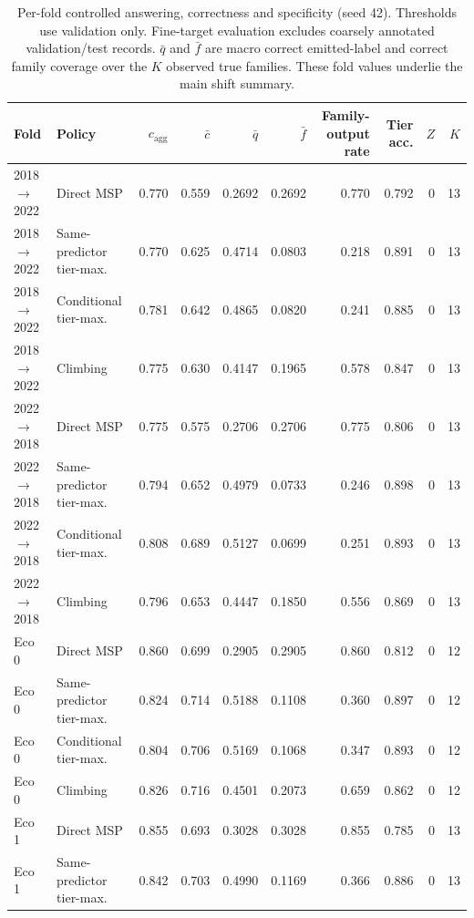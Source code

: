 \begin{table}[htbp]
\centering\footnotesize
\setlength{\tabcolsep}{3pt}
\caption{Per-fold controlled answering, correctness and specificity (seed 42). Thresholds use validation only. Fine-target evaluation excludes coarsely annotated validation/test records. $\bar q$ and $\bar f$ are macro correct emitted-label and correct family coverage over the $K$ observed true families. These fold values underlie the main shift summary.}\label{tab:supp-controls-folds}
\begin{tabular}{llrrrrrrrr}
\toprule
Fold & Policy & $c_{\mathrm{agg}}$ & $\bar c$ & $\bar q$ & $\bar f$ & \shortstack{Family-output\\rate} & Tier acc. & $Z$ & $K$ \\
\midrule
2018$\to$2022 & Direct MSP & 0.770 & 0.559 & 0.2692 & 0.2692 & 0.770 & 0.792 & 0 & 13 \\
2018$\to$2022 & Same-predictor tier-max. & 0.770 & 0.625 & 0.4714 & 0.0803 & 0.218 & 0.891 & 0 & 13 \\
2018$\to$2022 & Conditional tier-max. & 0.781 & 0.642 & 0.4865 & 0.0820 & 0.241 & 0.885 & 0 & 13 \\
2018$\to$2022 & Climbing & 0.775 & 0.630 & 0.4147 & 0.1965 & 0.578 & 0.847 & 0 & 13 \\
2022$\to$2018 & Direct MSP & 0.775 & 0.575 & 0.2706 & 0.2706 & 0.775 & 0.806 & 0 & 13 \\
2022$\to$2018 & Same-predictor tier-max. & 0.794 & 0.652 & 0.4979 & 0.0733 & 0.246 & 0.898 & 0 & 13 \\
2022$\to$2018 & Conditional tier-max. & 0.808 & 0.689 & 0.5127 & 0.0699 & 0.251 & 0.893 & 0 & 13 \\
2022$\to$2018 & Climbing & 0.796 & 0.653 & 0.4447 & 0.1850 & 0.556 & 0.869 & 0 & 13 \\
Eco 0 & Direct MSP & 0.860 & 0.699 & 0.2905 & 0.2905 & 0.860 & 0.812 & 0 & 12 \\
Eco 0 & Same-predictor tier-max. & 0.824 & 0.714 & 0.5188 & 0.1108 & 0.360 & 0.897 & 0 & 12 \\
Eco 0 & Conditional tier-max. & 0.804 & 0.706 & 0.5169 & 0.1068 & 0.347 & 0.893 & 0 & 12 \\
Eco 0 & Climbing & 0.826 & 0.716 & 0.4501 & 0.2073 & 0.659 & 0.862 & 0 & 12 \\
Eco 1 & Direct MSP & 0.855 & 0.693 & 0.3028 & 0.3028 & 0.855 & 0.785 & 0 & 13 \\
Eco 1 & Same-predictor tier-max. & 0.842 & 0.703 & 0.4990 & 0.1169 & 0.366 & 0.886 & 0 & 13 \\

\end{tabular}
\end{table}
